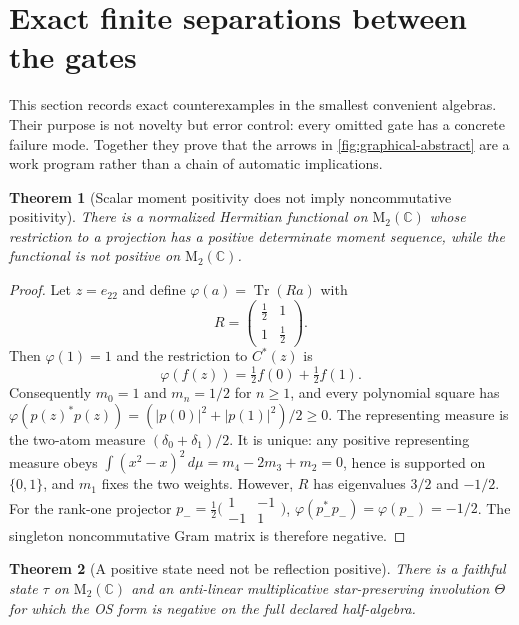 \documentclass[11pt,a4paper]{article}
\newtheorem{theorem}{Theorem}[section]
\theoremstyle{definition}
\theoremstyle{remark}
\newcommand{\C}{\mathbb C}
\newcommand{\M}{\mathrm M}
\newcommand{\Tr}{\operatorname{Tr}}
\begin{document}
\section{Exact finite separations between the gates}
\label{sec:counterexamples}

This section records exact counterexamples in the smallest convenient algebras.  Their
purpose is not novelty but error control: every omitted gate has a concrete failure
mode.  Together they prove that the arrows in \cref{fig:graphical-abstract} are a work
program rather than a chain of automatic implications.

\begin{theorem}[Scalar moment positivity does not imply noncommutative positivity]
There is a normalized Hermitian functional on $\M_2(\C)$ whose restriction to a
projection has a positive determinate moment sequence, while the functional is not
positive on $\M_2(\C)$.
\end{theorem}

\begin{proof}
Let $z=e_{22}$ and define $\varphi(a)=\Tr(Ra)$ with
\begin{equation}
 R=\begin{pmatrix}\tfrac12&1\\[2pt]1&\tfrac12\end{pmatrix}.
 \label{eq:bad-density}
\end{equation}
Then $\varphi(1)=1$ and the restriction to $C^*(z)$ is
\[
 \varphi(f(z))=\tfrac12 f(0)+\tfrac12 f(1).
\]
Consequently $m_0=1$ and $m_n=1/2$ for $n\geq1$, and every polynomial square has
$\varphi(p(z)^*p(z))=(|p(0)|^2+|p(1)|^2)/2\geq0$.  The representing measure is the
two-atom measure $(\delta_0+\delta_1)/2$.  It is unique: any positive representing
measure obeys
$\int(x^2-x)^2\,d\mu=m_4-2m_3+m_2=0$, hence is supported on $\{0,1\}$, and $m_1$
fixes the two weights.  However, $R$ has eigenvalues $3/2$ and
$-1/2$.  For the rank-one projector
$p_-=\frac12\bigl(\begin{smallmatrix}1&-1\\-1&1\end{smallmatrix}\bigr)$,
$\varphi(p_-^*p_-)=\varphi(p_-)=-1/2$.  The singleton noncommutative Gram matrix is
therefore negative.
\end{proof}

\begin{theorem}[A positive state need not be reflection positive]
There is a faithful state $\tau$ on $\M_2(\C)$ and an anti-linear multiplicative
star-preserving involution $\Theta$ for which the OS form is negative on the full
declared half-algebra.
\end{theorem}
\end{document}
